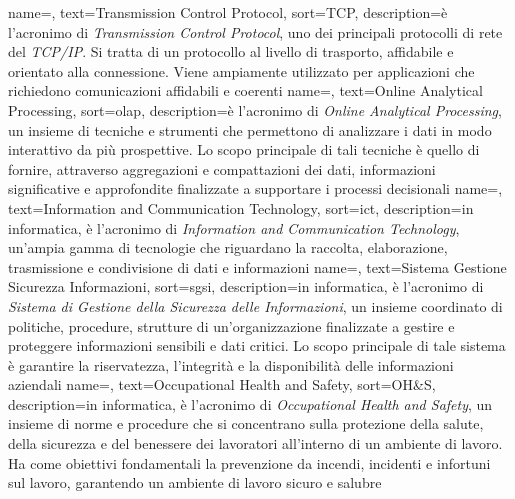  {
    name=,
    text=Transmission Control Protocol,
    sort=TCP,
    description={è l'acronimo di \textit{Transmission Control Protocol}, uno dei principali protocolli di rete del \textit{TCP/IP}. Si tratta di un 
    protocollo al livello di trasporto, affidabile e orientato alla connessione. Viene ampiamente utilizzato per applicazioni 
    che richiedono comunicazioni affidabili e coerenti}
}
 {
    name=,
    text=Online Analytical Processing,
    sort=olap,
    description={è l'acronimo di \textit{Online Analytical Processing}, un insieme di tecniche e strumenti che permettono di analizzare i dati in modo 
    interattivo da più prospettive. Lo scopo principale di tali tecniche è quello di fornire, attraverso aggregazioni e compattazioni dei dati, informazioni 
    significative e approfondite finalizzate a supportare i processi decisionali}
}
 {
    name=,
    text=Information and Communication Technology,
    sort=ict,
    description={in informatica, è l'acronimo di \textit{Information and Communication Technology}, un'ampia gamma di tecnologie che riguardano la raccolta, 
    elaborazione, trasmissione e condivisione di dati e informazioni}
}
 {
    name=,
    text=Sistema Gestione Sicurezza Informazioni,
    sort=sgsi,
    description={in informatica, è l'acronimo di \textit{Sistema di Gestione della Sicurezza delle Informazioni}, un insieme coordinato di politiche, procedure, strutture di un'organizzazione finalizzate a 
    gestire e proteggere informazioni sensibili e dati critici. Lo scopo principale di tale sistema è garantire la riservatezza, l'integrità 
    e la disponibilità delle informazioni aziendali}
}
 {
    name=,
    text=Occupational Health and Safety,
    sort=OH\&S,
    description={in informatica, è l'acronimo di \textit{Occupational Health and Safety}, un insieme di norme e procedure che si concentrano 
    sulla protezione della salute, della sicurezza e del benessere dei lavoratori all'interno di un ambiente di lavoro. Ha come obiettivi 
    fondamentali la prevenzione da incendi, incidenti e infortuni sul lavoro, garantendo un ambiente di lavoro sicuro e salubre}
}
